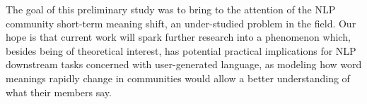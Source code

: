 
The goal of this preliminary study was to bring to the attention of the NLP community short-term meaning shift, an under-studied problem in the field. 
Our hope is that current work will spark further research into a phenomenon which, besides being of theoretical interest, has potential practical implications for NLP downstream tasks concerned with user-generated language, as modeling how word meanings rapidly change in communities would allow a better understanding of what their members say.



%



